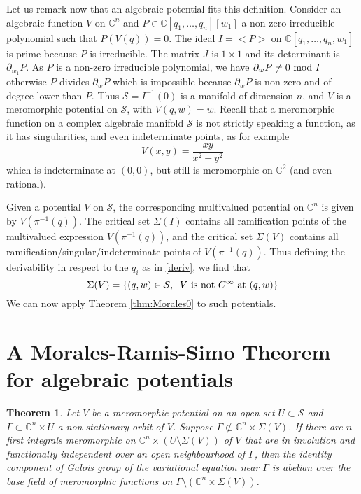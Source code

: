 \documentclass[smallcondensed]{svjour3}
\newtheorem{thm}{Theorem}
\begin{document}
Let us remark now that an algebraic potential fits this definition. Consider an algebraic function $V$ on $\mathbb{C}^n$ and $P\in\mathbb{C}[q_1,\dots,q_n][w_1]$ a non-zero irreducible polynomial such that $P(V(q))=0$. The ideal $I=<\!P\!>$ on $\mathbb{C}[q_1,\dots,q_n,w_1]$ is prime because $P$ is irreducible. The matrix $J$ is $1\times 1$ and its determinant is $\partial_{w_1} P$. As $P$ is a non-zero irreducible polynomial, we have $\partial_w P\neq 0 \hbox{ mod } I$ otherwise $P$ divides $\partial_w P$ which is impossible because $\partial_w P$ is non-zero and of degree lower than $P$. Thus $\mathcal{S}=I^{-1}(0)$ is a manifold of dimension $n$, and $V$ is a meromorphic potential on $\mathcal{S}$, with $V(q,w)=w$. Recall that a meromorphic function on a complex algebraic manifold $\mathcal{S}$ is not strictly speaking a function, as it has singularities, and even indeterminate points, as for example
$$V(x,y)=\frac{xy}{x^2+y^2}$$
which is indeterminate at $(0,0)$, but still is meromorphic on $\mathbb{C}^2$ (and even rational).

\medskip

Given a potential $V$ on $\mathcal{S}$, the corresponding multivalued potential on $\mathbb{C}^n$ is given by $V(\pi^{-1}(q))$. The critical set $\Sigma(I)$ contains all ramification points of the multivalued expression $V(\pi^{-1}(q))$, and the critical set $\Sigma(V)$ contains all ramification/singular/indeterminate points of $V(\pi^{-1}(q))$. Thus defining the derivability in respect to the $q_i$ as in \eqref{deriv}, we find that
$$\Sigma(V)= \{ (q,w)\in \mathcal{S},\;\; V \hbox{ is not } C^\infty \hbox{ at } (q,w)\}$$
We can now apply Theorem \ref{thm:Morales0} to such potentials.


\section{A Morales-Ramis-Simo Theorem for algebraic potentials}

\begin{thm}\label{thmmorales}
Let $V$ be a meromorphic potential on an open set $U\subset \mathcal{S}$ and $\Gamma\subset \mathbb{C}^n\times U$ a non-stationary orbit of $V$. Suppose $\Gamma\not\subset \mathbb{C}^n\times\Sigma(V)$. If there are $n$ first integrals meromorphic on $\mathbb{C}^n\times (U \setminus \Sigma(V))$ of $V$ that are in involution and functionally independent over an open neighbourhood of $\Gamma$, then the identity component of Galois group of the variational equation near $\Gamma$ is abelian over the base field of meromorphic functions on $\Gamma\setminus (\mathbb{C}^n\times\Sigma(V))$.
\end{thm}
\end{document}

